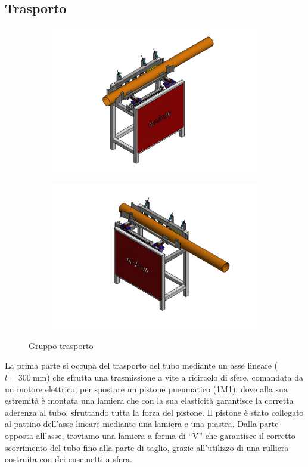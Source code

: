\documentclass{report}
\begin{document}
\subsection{Trasporto}
\begin{figure}[H]
  \centering
  \begin{subfigure}[H]{0.45\textwidth}
    \centering
    \includegraphics[width=\textwidth]{src/img/trasporto_1.pdf}
  \end{subfigure}
  \hfill
  \begin{subfigure}[H]{0.45\textwidth}
    \centering
    \includegraphics[width=\textwidth]{src/img/trasporto_2.pdf}
    \end{subfigure}
    \caption{Gruppo trasporto}
    \label{fig:vtcons}
\end{figure}
La prima parte si occupa del trasporto del tubo mediante un asse lineare ($l=\SI{300}{\mm}$) che sfrutta una trasmissione a vite a ricircolo di sfere, comandata da un motore elettrico, per spostare un pistone pneumatico (1M1), dove alla sua estremità è montata una lamiera che con la sua elasticità garantisce la corretta aderenza al tubo, sfruttando tutta la forza del pistone. Il pistone è stato collegato al pattino dell’asse lineare mediante una lamiera e una piastra. Dalla parte opposta all’asse, troviamo una lamiera a forma di “V” che garantisce il corretto scorrimento del tubo fino alla parte di taglio, grazie all’utilizzo di una rulliera costruita con dei cuscinetti a sfera.
\end{document}
